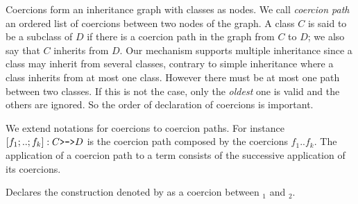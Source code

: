 Coercions form an inheritance graph with classes as nodes.  We call
{\em coercion path} an ordered list of coercions between two nodes of
the graph.  A class $C$ is said to be a subclass of $D$ if there is a
coercion path in the graph from $C$ to $D$; we also say that $C$
inherits from $D$. Our mechanism supports multiple inheritance since a
class may inherit from several classes, contrary to simple inheritance
where a class inherits from at most one class.  However there must be
at most one path between two classes.  If this is not the case, only
the {\em oldest} one is valid and the others are ignored. So the order
of declaration of coercions is important.

We extend notations for coercions to coercion paths. For instance
$[f_1;..;f_k]:C \mbox{\texttt{>->}} D$ is the coercion path composed
by the coercions $f_1..f_k$.  The application of a coercion path to a
term consists of the successive application of its coercions.








Declares the construction denoted by {\qualid} as a coercion between
{\class$_1$} and {\class$_2$}.

   
